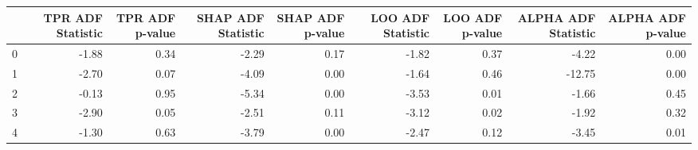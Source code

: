 \begin{tabular}{lrrrrrrrr}
\toprule
 & TPR ADF Statistic & TPR ADF p-value & SHAP ADF Statistic & SHAP ADF p-value & LOO ADF Statistic & LOO ADF p-value & ALPHA ADF Statistic & ALPHA ADF p-value \\
\midrule
0 & -1.88 & 0.34 & -2.29 & 0.17 & -1.82 & 0.37 & -4.22 & 0.00 \\
1 & -2.70 & 0.07 & -4.09 & 0.00 & -1.64 & 0.46 & -12.75 & 0.00 \\
2 & -0.13 & 0.95 & -5.34 & 0.00 & -3.53 & 0.01 & -1.66 & 0.45 \\
3 & -2.90 & 0.05 & -2.51 & 0.11 & -3.12 & 0.02 & -1.92 & 0.32 \\
4 & -1.30 & 0.63 & -3.79 & 0.00 & -2.47 & 0.12 & -3.45 & 0.01 \\
\bottomrule
\end{tabular}
